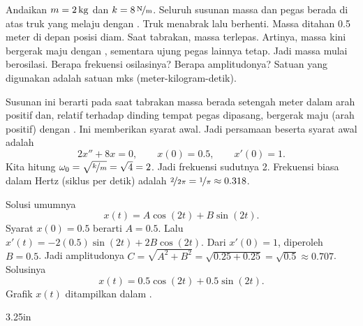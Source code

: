 \begin{example}
Andaikan $m=\unit[2]{kg}$ dan $k=\unitfrac[8]{N}{m}$. Seluruh susunan massa dan pegas berada di atas truk yang melaju dengan . Truk menabrak lalu berhenti. Massa ditahan 0.5 meter di depan posisi diam. Saat tabrakan, massa terlepas. Artinya, massa kini bergerak maju dengan , sementara ujung pegas lainnya tetap. Jadi massa mulai berosilasi. Berapa frekuensi osilasinya? Berapa amplitudonya? Satuan yang digunakan adalah satuan mks (meter-kilogram-detik).

Susunan ini berarti pada saat tabrakan massa berada setengah meter dalam arah positif dan, relatif terhadap dinding tempat pegas dipasang, bergerak maju (arah positif) dengan . Ini memberikan syarat awal. Jadi persamaan beserta syarat awal adalah
\begin{equation*}
2 x'' + 8 x = 0 , \qquad x(0) = 0.5, \qquad x'(0) = 1.
\end{equation*}
Kita hitung $\omega_0 = \sqrt{\nicefrac{k}{m}} = \sqrt{4} = 2$. Jadi frekuensi sudutnya 2. Frekuensi biasa dalam Hertz (siklus per detik) adalah $\nicefrac{2}{2\pi} = \nicefrac{1}{\pi} \approx 0.318$.

Solusi umumnya
\begin{equation*}
x(t) = A \cos (2t) + B \sin (2t) .
\end{equation*}
Syarat $x(0) = 0.5$ berarti $A = 0.5$. Lalu $x'(t) = - 2(0.5) \sin (2t) + 2B \cos (2t)$. Dari $x'(0) = 1$, diperoleh $B = 0.5$. Jadi amplitudonya $C = \sqrt{A^2+B^2} = \sqrt{0.25+0.25} = \sqrt{0.5} \approx 0.707$. Solusinya
\begin{equation*}
x(t) = 0.5 \cos (2t) + 0.5 \sin (2t) .
\end{equation*}
Grafik $x(t)$ ditampilkan dalam .
\end{example}

\begin{mywrapfig}[15]{3.25in}
\capstart
{}
\caption{Osilasi sederhana tak teredam.\label{mv:undampedfig}}
\end{mywrapfig}

